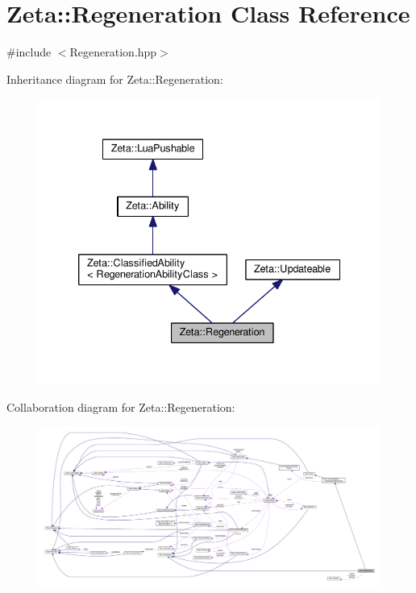\hypertarget{classZeta_1_1Regeneration}{\section{Zeta\+:\+:Regeneration Class Reference}
\label{classZeta_1_1Regeneration}
}


{\ttfamily \#include $<$Regeneration.\+hpp$>$}



Inheritance diagram for Zeta\+:\+:Regeneration\+:\nopagebreak
\begin{figure}[H]
\begin{center}
\leavevmode
\includegraphics[width=335pt]{classZeta_1_1Regeneration__inherit__graph}
\end{center}
\end{figure}


Collaboration diagram for Zeta\+:\+:Regeneration\+:
\nopagebreak
\begin{figure}[H]
\begin{center}
\leavevmode
\includegraphics[width=350pt]{classZeta_1_1Regeneration__coll__graph}
\end{center}
\end{figure}
